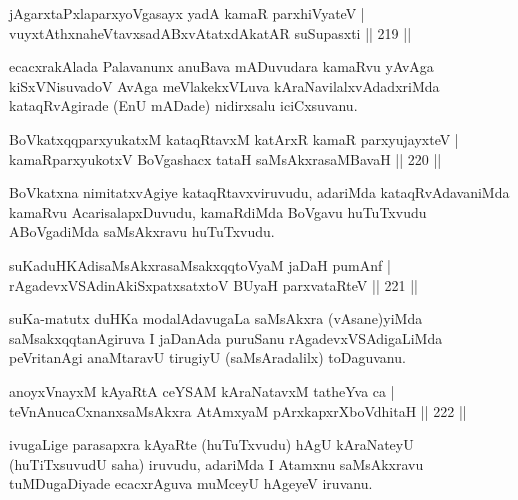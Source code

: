 \begin{shl}
jAgarxtaPxlaparxyoVgasayx yadA kamaR parxhiVyateV |\\
vuyxtAthxnaheVtavxsadABxvAtatxdAkatAR suSupasxti \hfill || 219 ||
\end{shl}

\begin{artha}
ecacxrakAlada Palavanunx anuBava mADuvudara kamaRvu yAvAga kiSxVNisu\-vadoV AvAga meVlakekxVLuva kAraNavilalxvAdadxriMda kataqRvAgirade (EnU mADade) nidirxsalu iciCxsuvanu.
\end{artha}

\begin{shl}
BoVkatxqqparxyukatxM kataqRtavxM katArxR kamaR parxyujayxteV |\\
kamaRparxyukotxV BoVgashacx tataH saMsAkxrasaMBavaH \hfill || 220 ||
\end{shl}

\begin{artha}
BoVkatxna nimitatxvAgiye kataqRtavxviruvudu, adariMda kataqRvAdavaniMda kamaRvu AcarisalapxDuvudu, kamaRdiMda BoVgavu huTuTxvudu ABoVgadiMda saMsAkxravu huTuTxvudu.
\end{artha}


\begin{shl}
suKaduHKAdisaMsAkxrasaMsakxqqtoV\s yaM jaDaH pumAnf |\\
rAgadevxVSAdinA\s \s kiSxpatxsatxtoV BUyaH parxvataRteV \hfill || 221 ||
\end{shl}

\begin{artha}
suKa-matutx duHKa modalAdavugaLa saMsAkxra (vAsane)yiMda saMsakxqqta\-nAgiruva I jaDanAda puruSanu rAgadevxVSAdigaLiMda peVritanAgi anaMtaravU \-tirugiyU (saMsAradalilx) toDaguvanu.
\end{artha}

\begin{shl}
anoyxVnayxM kAyaRtA ceYSAM kAraNatavxM tatheYva ca |\\
teVnAnucaCxnanxsaMsAkxra AtAmx\s yaM pArxkapxrXboVdhitaH \hfill || 222 ||
\end{shl}

\begin{artha}
ivugaLige parasapxra kAyaRte (huTuTxvudu) hAgU kAraNateyU (huTiTxsu\-vudU saha) iruvudu, adariMda I Atamxnu saMsAkxravu tuMDugaDiyade \-ecacxrAguva muMceyU hAgeyeV iruvanu.
\end{artha}


